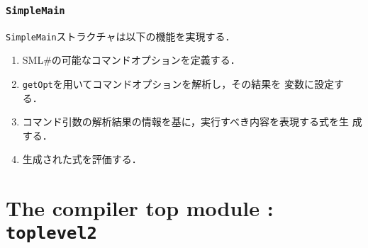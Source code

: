 \documentclass{jbook}
\newif\ifjp
\newcommand{\txt}[2]{#2}
\newcommand{\smlsharp}{SML\#}
\newcommand{\code}[1]{\mbox{\large\tt #1}}
\begin{document}
\subsection{\code{SimpleMain}}
	\code{SimpleMain}ストラクチャは以下の機能を実現する．
\begin{enumerate}
\item \smlsharp{}の可能なコマンドオプションを定義する．
\item \code{getOpt}を用いてコマンドオプションを解析し，その結果を
変数に設定する．
\item コマンド引数の解析結果の情報を基に，実行すべき内容を表現する式を生
成する．
\item 生成された式を評価する．
\end{enumerate}

\fi%


% 
\chapter{\txt
{コンパイラトップモジュール：\code{toplevel2}}
{The compiler top module : \code{toplevel2}}
}
\label{chap:Loadfile}

\ifjp%
\begin{enumerate}
\item ソースロケーションとファイル構成

ディレクトリ \code{src/compiler/toplevel2/main}下の以下のファイルからなる．
\begin{itemize}
\item \code{Top.sml} コンパイラトップレベルの処理を実現
\item \code{TopData.ppg} トップレベル処理のためのデータ構造の定義．
\item \code{NameEvalEnvUtils.sml} 対話型モード実現のため．名前評価モジュール環境の更新．
\end{itemize}

\item 機能概要 
\begin{enumerate}
\item ソースファイルのコンパイル
\item メイン関数コードの生成
\item 対話型環境の構築
\item 組込環境のセットアップ
\end{enumerate}
\item 他モジュールとのインターフェイス
\begin{itemize}
\item \code{src/compiler/main/main/SimpleMain.sml}から呼び出される．
\item \code{src/compiler/main/main/RunLoop.sml}から呼び出される．
\end{itemize}
\end{enumerate}
\else%
\fi%
\end{document}
